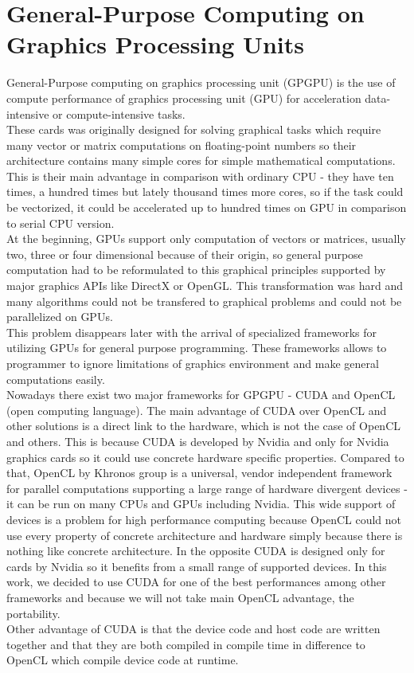 \chapter{General-Purpose Computing on Graphics Processing Units}
General-Purpose computing on graphics processing unit (GPGPU) is the use of compute performance of graphics processing unit (GPU) for acceleration data-intensive or compute-intensive tasks.\\
These cards was originally designed for solving graphical tasks which require many vector or matrix computations on floating-point numbers so their architecture contains many simple cores for simple mathematical computations. This is their main advantage in comparison with ordinary CPU - they have ten times, a hundred times but lately thousand times more cores, so if the task could be vectorized, it could be accelerated up to hundred times on GPU in comparison to serial CPU version.\\
At the beginning, GPUs support only computation of vectors or matrices, usually two, three or four dimensional because of their origin, so general purpose computation had to be reformulated to this graphical principles supported by major graphics APIs like DirectX or OpenGL. This transformation was hard and many algorithms could not be transfered to graphical problems and could not be parallelized on GPUs.\\
This problem disappears later with the arrival of specialized frameworks for utilizing GPUs for general purpose programming. These frameworks allows to programmer to ignore limitations of graphics environment and make general computations easily.\\
Nowadays there exist two major frameworks for GPGPU - CUDA and OpenCL (open computing language). The main advantage of CUDA over OpenCL and other solutions is a direct link to the hardware, which is not the case of OpenCL and others. This is because CUDA is developed by Nvidia and only for Nvidia graphics cards so it could use concrete hardware specific properties. Compared to that, OpenCL by Khronos group is a universal, vendor independent framework for parallel computations supporting a large range of hardware divergent devices - it can be run on many CPUs and GPUs including Nvidia. This wide support of devices is a problem for high performance computing because OpenCL could not use every property of concrete architecture and hardware simply because there is nothing like concrete architecture. In the opposite CUDA is designed only for cards by Nvidia so it benefits from a small range of supported devices. In this work, we decided to use CUDA for one of the best performances among other frameworks and because we will not take main OpenCL advantage, the portability.\\
Other advantage of CUDA is that the device code and host code are written together and that they are both compiled in compile time in difference to OpenCL which compile device code at runtime.


